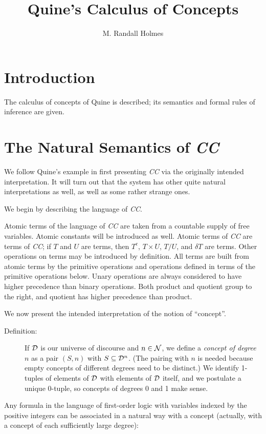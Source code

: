 \documentclass{article}
\title{Quine's Calculus of Concepts}
\author{M. Randall Holmes}
\begin{document}
\maketitle

\section{Introduction}

The calculus of concepts of Quine is described; its semantics and
formal rules of inference are given.

\section{The Natural Semantics of {\em CC\/}}

We follow Quine's example in first presenting {\em CC\/} via the
originally intended interpretation.  It will turn out that the system
has other quite natural interpretations as well, as well as some
rather strange ones.

We begin by describing the language of {\em CC\/}.

Atomic terms of the language of {\em CC\/} are taken from a countable
supply of free variables.  Atomic constants will be introduced as
well.  Atomic terms of {\em CC\/} are terms of {\em CC\/}; if $T$ and
$U$ are terms, then $T^c$, $T\times U$, $T/U$, and $\delta T$ are
terms.  Other operations on terms may be introduced by definition.
All terms are built from atomic terms by the primitive operations and
operations defined in terms of the primitive operations below.  Unary
operations are always considered to have higher precedence than binary
operations.  Both product and quotient group to the right, and
quotient has higher precedence than product.

We now present the intended interpretation of the notion of
``concept''.
\begin{description} \item[Definition:] If ${\cal D}$ is our universe
of discourse and $n \in {\cal N}$, we define a {\em concept of degree
$n$\/} as a pair $(S,n)$ with $S \subseteq {\cal D}^n$.  (The pairing
with $n$ is needed because empty concepts of different degrees need to
be distinct.)  We identify 1-tuples of elements of ${\cal D}$ with
elements of ${\cal D\/}$ itself, and we postulate a unique 0-tuple, so
concepts of degrees 0 and 1 make sense. \end{description}

Any formula in the language of first-order logic with variables
indexed by the positive integers can be associated in a natural way
with a concept (actually, with a concept of each sufficiently large
degree):
\end{document}
